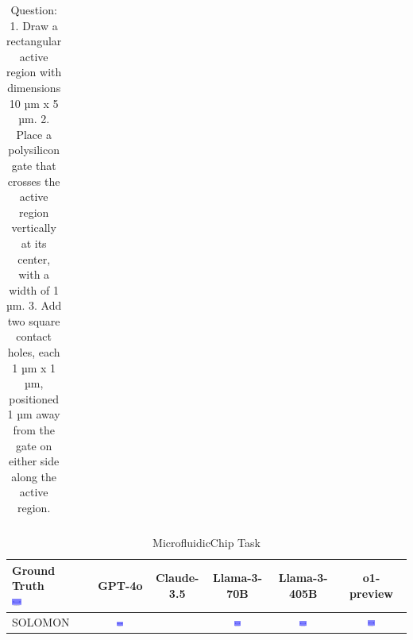 \begin{table}
\begin{tabular}{@{}lccccc@{}}
    \bottomrule
  \end{tabular}
  \caption*{Question: 1. Draw a rectangular active region with dimensions 10 µm x 5 µm.
2. Place a polysilicon gate that crosses the active region vertically at its center, with a width of 1 µm.
3. Add two square contact holes, each 1 µm x 1 µm, positioned 1 µm away from the gate on either side along the active region.}
\end{table}

\begin{table}
  \caption{MicrofluidicChip Task}
  \label{table:microfluidicchip}
  \centering
  \begin{tabular}{@{}lccccc@{}}
    \toprule
    \makecell{Ground Truth \\ \includegraphics[width=0.13\textwidth]{examples_png/MicrofluidicChip.png}} & GPT-4o & Claude-3.5 & Llama-3-70B & Llama-3-405B & o1-preview \\
    \midrule
    SOLOMON & \includegraphics[width=0.13\textwidth]{./pool_all/png/gpt-4o_results/MicrofluidicChip.png} &  & \includegraphics[width=0.13\textwidth]{./pool_all/png/claude-3-5-sonnet-20240620_results/MicrofluidicChip.png} & \includegraphics[width=0.13\textwidth]{./pool_all/png/watsonx_meta-llama_llama-3-1-70b-instruct_results/MicrofluidicChip.png} & \includegraphics[width=0.13\textwidth]{./pool_all/png/watsonx_meta-llama_llama-3-405b-instruct_results/MicrofluidicChip.png} \\

\end{tabular}
\end{table}
